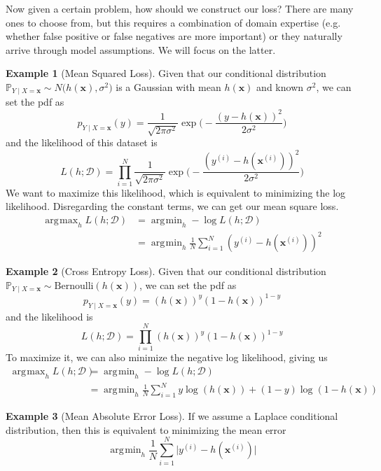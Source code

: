 \documentclass{article}
\DeclareMathOperator*{\argmin}{\arg\!\min}
\DeclareMathOperator*{\argmax}{\arg\!\max}
\theoremstyle{definition}
\newtheorem{example}{Example}[section]
\begin{document}
    Now given a certain problem, how should we construct our loss? There are many ones to choose from, but this requires a combination of domain expertise (e.g. whether false positive or false negatives are more important) or they naturally arrive through model assumptions. We will focus on the latter. 

    \begin{example}[Mean Squared Loss]
    Given that our conditional distribution $\mathbb{P}_{Y \mid X = \mathbf{x}} \sim N\big( h(\mathbf{x}), \sigma^2)$ is a Gaussian with mean $h(\mathbf{x})$ and known $\sigma^2$, we can set the pdf as 
    \[p_{Y \mid X = \mathbf{x}} (y) = \frac{1}{\sqrt{2\pi \sigma^2}} \exp \bigg( -\frac{ (y - h(\mathbf{x}))^2}{2 \sigma^2} \bigg) \]
    and the likelihood of this dataset is 
    \[L(h; \mathcal{D}) = \prod_{i=1}^N \frac{1}{\sqrt{2\pi \sigma^2}} \exp \bigg( -\frac{ (y^{(i)} - h(\mathbf{x}^{(i)}))^2}{2 \sigma^2} \bigg)\]
    We want to maximize this likelihood, which is equivalent to minimizing the log likelihood. Disregarding the constant terms, we can get our mean square loss. 
    \begin{align*}
        \argmax_h L(h; \mathcal{D}) & = \argmin_h -\log L(h; \mathcal{D}) \\
        & = \argmin_h \frac{1}{N} \sum_{i=1}^N (y^{(i)} - h( \mathbf{x}^{(i)}))^2 
    \end{align*}
    \end{example}

    \begin{example}[Cross Entropy Loss]
    Given that our conditional distribution $\mathbb{P}_{Y \mid X = \mathbf{x}} \sim \mathrm{Bernoulli}(h(\mathbf{x}))$, we can set the pdf as 
    \[p_{Y \mid X = \mathbf{x}} (y) = (h(\mathbf{x}))^y (1 - h(\mathbf{x}))^{1 - y}\]
    and the likelihood is 
    \[L(h; \mathcal{D}) = \prod_{i=1}^N (h(\mathbf{x}))^y (1 - h(\mathbf{x}))^{1 - y}\]
    To maximize it, we can also minimize the negative log likelihood, giving us 
    \begin{align*}
        \argmax_h L(h; \mathcal{D}) & = \argmin_h -\log L(h; \mathcal{D}) \\
        & = \argmin_h \frac{1}{N} \sum_{i=1}^N y \log (h(\mathbf{x})) + (1 - y) \log (1 - h(\mathbf{x})) 
    \end{align*}
    \end{example}

    \begin{example}[Mean Absolute Error Loss]
    If we assume a Laplace conditional distribution, then this is equivalent to minimizing the mean error 
    \[\argmin_h \frac{1}{N} \sum_{i=1}^N \big| y^{(i)} - h(\mathbf{x}^{(i)}) \big| \]
    \end{example}
\end{document}
